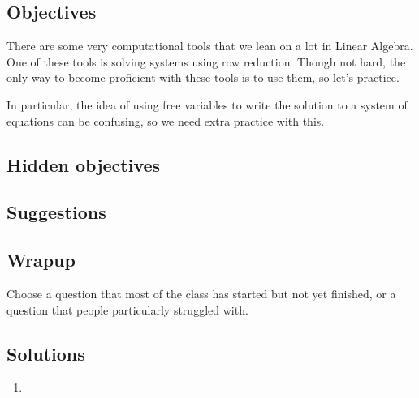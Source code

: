 \documentclass[11pt]{exam}
\begin{document}
\subsection*{Objectives}

	There are some very computational tools that we lean on a lot
	in Linear Algebra.  One of these tools is solving systems using row 
	reduction.  Though not hard, the only way to become proficient with
	these tools is to use them, so let's practice.

	In particular, the idea of using free variables to write
	the solution to a system of equations can be confusing, so 
	we need extra practice with this.

\subsection*{Hidden objectives}
	

\subsection*{Suggestions}

\subsection*{Wrapup}
	Choose a question that most of the class has started but not yet finished,
	or a question that people particularly struggled with.

\subsection*{Solutions}
\begin{enumerate}
	\item
\end{enumerate}
	
\end{document}

